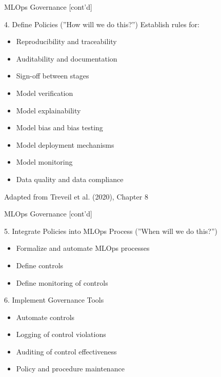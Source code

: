 \documentclass[ignorenonframetext,xcolor=x11names]{beamer}
\begin{document}
\begin{frame}[label=full]{MLOps Governance \small [cont'd]}
\footnotesize
\begin{block}{4. Define Policies (''How will we do this?'')}
Establish rules for:
\begin{itemize}
   \item Reproducibility and traceability
   \item Auditability and documentation
   \item Sign-off between stages
   \item Model verification
   \item Model explainability
   \item Model bias and bias testing
   \item Model deployment mechanisms
   \item Model monitoring
   \item Data quality and data compliance
\end{itemize}
\end{block}
\tiny Adapted from Treveil et al. (2020), Chapter 8
\end{frame}

\begin{frame}[label=full]{MLOps Governance \small [cont'd]}
\footnotesize
\begin{block}{5. Integrate Policies into MLOps Process (''When will we do this?'')}
\begin{itemize}
   \item Formalize and automate MLOps processes
   \item Define controls
   \item Define monitoring of controls
\end{itemize}
\end{block}

\begin{block}{6. Implement Governance Tools}
\begin{itemize}
   \item Automate controls
   \item Logging of control violations
   \item Auditing of control effectiveness
   \item Policy and procedure maintenance
\end{itemize}
\end{block}
\end{frame}
\end{document}
